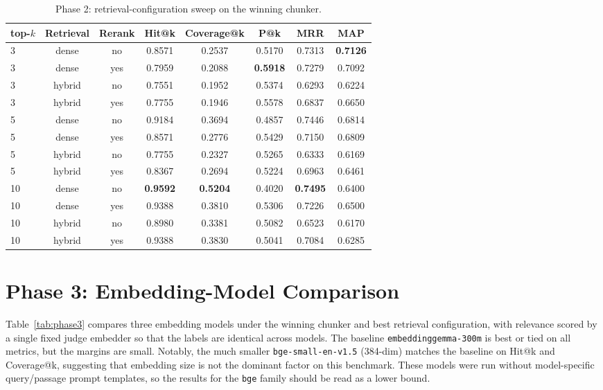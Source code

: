 \documentclass[12pt,a4paper,titlepage,oneside]{book}
\begin{document}
\begin{table}[htbp]
\centering
\caption{Phase 2: retrieval-configuration sweep on the winning chunker.}
\label{tab:phase2}
\begin{tabular}{lccccccc}
\toprule
top-$k$ & Retrieval & Rerank & Hit@k & Coverage@k & P@k & MRR & MAP \\
\midrule
3 & dense & no & 0.8571 & 0.2537 & 0.5170 & 0.7313 & \textbf{0.7126} \\
3 & dense & yes & 0.7959 & 0.2088 & \textbf{0.5918} & 0.7279 & 0.7092 \\
3 & hybrid & no & 0.7551 & 0.1952 & 0.5374 & 0.6293 & 0.6224 \\
3 & hybrid & yes & 0.7755 & 0.1946 & 0.5578 & 0.6837 & 0.6650 \\
5 & dense & no & 0.9184 & 0.3694 & 0.4857 & 0.7446 & 0.6814 \\
5 & dense & yes & 0.8571 & 0.2776 & 0.5429 & 0.7150 & 0.6809 \\
5 & hybrid & no & 0.7755 & 0.2327 & 0.5265 & 0.6333 & 0.6169 \\
5 & hybrid & yes & 0.8367 & 0.2694 & 0.5224 & 0.6963 & 0.6461 \\
10 & dense & no & \textbf{0.9592} & \textbf{0.5204} & 0.4020 & \textbf{0.7495} & 0.6400 \\
10 & dense & yes & 0.9388 & 0.3810 & 0.5306 & 0.7226 & 0.6500 \\
10 & hybrid & no & 0.8980 & 0.3381 & 0.5082 & 0.6523 & 0.6170 \\
10 & hybrid & yes & 0.9388 & 0.3830 & 0.5041 & 0.7084 & 0.6285 \\
\bottomrule
\end{tabular}
\end{table}

\section{Phase 3: Embedding-Model Comparison}
\label{sec:phase3}
Table~\ref{tab:phase3} compares three embedding models under the winning chunker and best retrieval configuration, with relevance scored by a single fixed judge embedder so that the labels are identical across models. The baseline \texttt{embeddinggemma-300m} is best or tied on all metrics, but the margins are small. Notably, the much smaller \texttt{bge-small-en-v1.5} (384-dim) matches the baseline on Hit@k and Coverage@k, suggesting that embedding size is not the dominant factor on this benchmark. These models were run without model-specific query/passage prompt templates, so the results for the \texttt{bge} family should be read as a lower bound.
\end{document}
